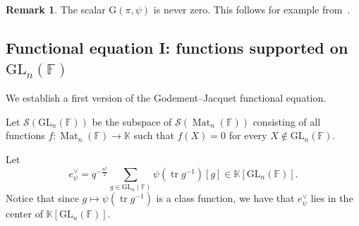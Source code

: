 \documentclass[12pt, reqno]{amsart}
\theoremstyle{definition}
\newtheorem{remark}[theorem]{Remark}
\newcommand{\coefficientsField}{\mathbb{K}}
\newcommand{\fieldCharacter}{\psi}
\newcommand{\trace}{\operatorname{tr}}
\newcommand{\GL}{\mathrm{GL}}
\newcommand{\finiteField}{\mathbb{F}}
\newcommand{\squareMatrix}{\operatorname{Mat}}
\newcommand{\GaussSumScalar}[2]{\mathrm{G}\left(#1, #2\right)}
\newcommand{\Schwartz}{\mathcal{S}}
\begin{document}
\begin{remark}\label{rem:kondo-gauss-sum-is-non-zero}
	The scalar $\GaussSumScalar{\pi}{\fieldCharacter}$ is never zero. This follows for example from~\cite[Proposition 4.9]{KurinczukMatringeSecherre2026}.
\end{remark}

\subsection{Functional equation I: functions supported on $\GL_n\left(\finiteField\right)$}
We establish a first version of the Godement--Jacquet functional equation.

Let $\Schwartz\left(\GL_n\left(\finiteField\right)\right)$ be the subspace of $\Schwartz\left(\squareMatrix_n\left(\finiteField\right)\right)$ consisting of all functions $f \colon \squareMatrix_n\left(\finiteField\right) \to \coefficientsField$ such that $f\left(X\right) = 0$ for every $X \notin \GL_n\left(\finiteField\right)$.


Let
\begin{displaymath}
e^{\vee}_{\fieldCharacter} = q^{-\frac{n^2}{2}} \sum_{g \in \GL_n\left(\finiteField\right)} \fieldCharacter\left(\trace g^{-1}\right) \left[g\right] \in \coefficientsField\left[\GL_n\left(\finiteField\right)\right].
\end{displaymath}
Notice that since $g \mapsto \fieldCharacter\left(\trace g^{-1}\right)$ is a class function, we have that $e_{\fieldCharacter}^{\vee}$ lies in the center of $\coefficientsField\left[\GL_n\left(\finiteField\right)\right]$.
\end{document}
